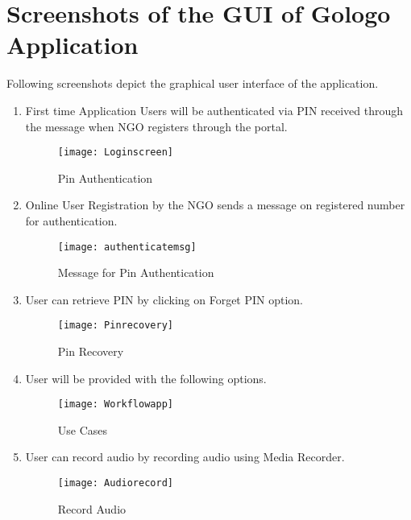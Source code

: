 \chapter{Screenshots of the GUI of Gologo Application}

Following screenshots depict the graphical user interface of the application.

\begin {enumerate}
\item First time Application Users will be authenticated via PIN received through the message when NGO registers through the portal.
\begin{figure}[H]
\begin{center}   
\texttt{[image: Loginscreen]}
\caption{Pin Authentication}
\label{fig:pin_authenticate}
\end{center}
\end{figure}

\item Online User Registration by the NGO sends a message on registered number for authentication.
\begin{figure}[H]
\begin{center}   
\texttt{[image: authenticatemsg]}
\caption{Message for Pin Authentication}
\label{fig:authenticatemsg}
\end{center}
\end{figure}

\item User can retrieve PIN by clicking on Forget PIN option.
\begin{figure}[H]
\begin{center}   
\texttt{[image: Pinrecovery]}
\caption{Pin Recovery}
\label{fig:pin_recovery}
\end{center}
\end{figure}

\item User will be provided with the following options.
\begin{figure}[H]
\begin{center}   
\texttt{[image: Workflowapp]}
\caption{Use Cases}
\label{fig:menuoptions}
\end{center}
\end{figure}

\item User can record audio by recording audio using Media Recorder.
\begin{figure}[H]
\begin{center}   
\texttt{[image: Audiorecord]}
\caption{Record Audio}
\label{fig:audio1}
\end{center}
\end{figure}


\end{enumerate}

